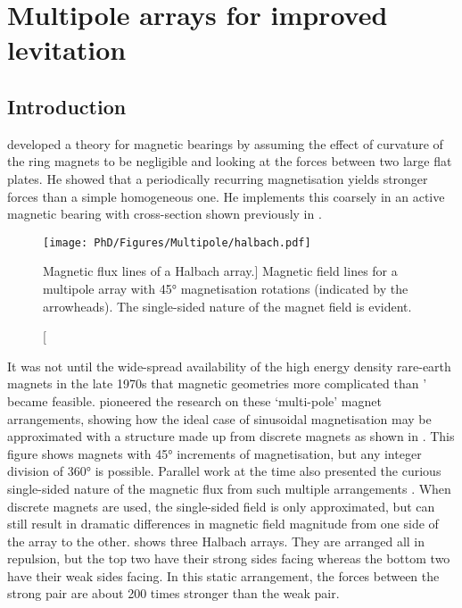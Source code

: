 \documentclass[11pt,a4paper]{memoir}
\begin{document}
\chapter{Multipole arrays for improved levitation}


\section{Introduction}

\textcite{backers1961} developed a theory for magnetic bearings
by assuming the effect of curvature of the ring magnets to be
negligible and looking at the forces between two large flat
plates. He showed that a periodically recurring magnetisation
yields stronger forces than a simple homogeneous one. He
implements this coarsely in an active magnetic bearing with
cross-section shown previously in .

\begin{figure}
\texttt{[image: PhD/Figures/Multipole/halbach.pdf]}
\caption
  [Magnetic flux lines of a Halbach array.]
  {
    Magnetic field lines for a multipole array with \ang{45} magnetisation rotations (indicated by the arrowheads).
    The single-sided nature of the magnet field is evident.
  }
\end{figure}

It was not until the wide-spread availability of the high energy
density rare-earth magnets in the late 1970s that magnetic
geometries more complicated than
\citeauthor{backers1961}' %
became feasible. \textcite{halbach1980} pioneered the research
on these `multi-pole' magnet arrangements, showing how the ideal
case of sinusoidal magnetisation may be approximated with a
structure made up from discrete magnets as shown in
.
This figure shows magnets with \ang{45} increments of magnetisation, but any integer division of \ang{360} is possible.
Parallel work at the time also presented the curious single-sided nature of the magnetic flux from such multiple arrangements \cite{shute2000-ietm}.
When discrete magnets are used, the single-sided field is only approximated, but can still result in dramatic differences in magnetic field magnitude from one side of the array to the other.
 shows three Halbach arrays.
They are arranged all in repulsion, but the top two have their strong sides facing whereas the bottom two have their weak sides facing.
In this static arrangement, the forces between the strong pair are about 200 times stronger than the weak pair.
\end{document}
